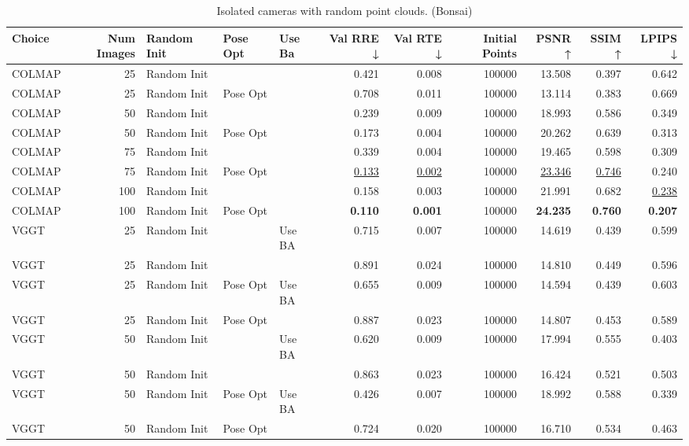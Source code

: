 \begin{table}[H]
\caption{Isolated cameras with random point clouds. (Bonsai)}
\label{tab:06_isolated_cams_num_points_bonsai}
\small
\begin{tabular}{lrlllrrrrrr}
\toprule
Choice & Num Images & Random Init & Pose Opt & Use Ba & Val RRE ↓ & Val RTE ↓ & Initial Points & PSNR ↑ & SSIM ↑ & LPIPS ↓ \\
\midrule
COLMAP & 25 & Random Init &  &  & 0.421 & 0.008 & 100000 & 13.508 & 0.397 & 0.642 \\
COLMAP & 25 & Random Init & Pose Opt &  & 0.708 & 0.011 & 100000 & 13.114 & 0.383 & 0.669 \\
COLMAP & 50 & Random Init &  &  & 0.239 & 0.009 & 100000 & 18.993 & 0.586 & 0.349 \\
COLMAP & 50 & Random Init & Pose Opt &  & 0.173 & 0.004 & 100000 & 20.262 & 0.639 & 0.313 \\
COLMAP & 75 & Random Init &  &  & 0.339 & 0.004 & 100000 & 19.465 & 0.598 & 0.309 \\
COLMAP & 75 & Random Init & Pose Opt &  & \underline{0.133} & \underline{0.002} & 100000 & \underline{23.346} & \underline{0.746} & 0.240 \\
COLMAP & 100 & Random Init &  &  & 0.158 & 0.003 & 100000 & 21.991 & 0.682 & \underline{0.238} \\
COLMAP & 100 & Random Init & Pose Opt &  & \textbf{0.110} & \textbf{0.001} & 100000 & \textbf{24.235} & \textbf{0.760} & \textbf{0.207} \\
VGGT & 25 & Random Init &  & Use BA & 0.715 & 0.007 & 100000 & 14.619 & 0.439 & 0.599 \\
VGGT & 25 & Random Init &  &  & 0.891 & 0.024 & 100000 & 14.810 & 0.449 & 0.596 \\
VGGT & 25 & Random Init & Pose Opt & Use BA & 0.655 & 0.009 & 100000 & 14.594 & 0.439 & 0.603 \\
VGGT & 25 & Random Init & Pose Opt &  & 0.887 & 0.023 & 100000 & 14.807 & 0.453 & 0.589 \\
VGGT & 50 & Random Init &  & Use BA & 0.620 & 0.009 & 100000 & 17.994 & 0.555 & 0.403 \\
VGGT & 50 & Random Init &  &  & 0.863 & 0.023 & 100000 & 16.424 & 0.521 & 0.503 \\
VGGT & 50 & Random Init & Pose Opt & Use BA & 0.426 & 0.007 & 100000 & 18.992 & 0.588 & 0.339 \\
VGGT & 50 & Random Init & Pose Opt &  & 0.724 & 0.020 & 100000 & 16.710 & 0.534 & 0.463 \\

\end{tabular}
\end{table}
